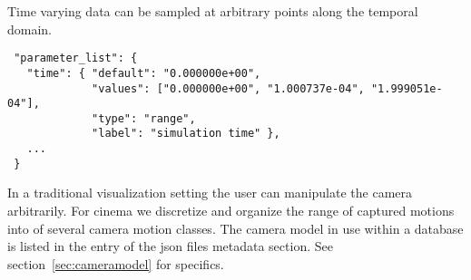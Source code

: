 \label{sec:Time}

Time varying data can be sampled at arbitrary points along the temporal domain.
\begin{verbatim}
 "parameter_list": {
   "time": { "default": "0.000000e+00",
             "values": ["0.000000e+00", "1.000737e-04", "1.999051e-04"],
             "type": "range",
             "label": "simulation time" },
   ...
 }
\end{verbatim}

\label{sec:camerapositions}

In a traditional visualization setting the user can manipulate the camera arbitrarily. For cinema we discretize and organize the range of captured motions into of several camera motion classes. 
The camera model in use within a database is listed in the \cameramodel
entry of the json files metadata section. 
See section~\ref{sec:cameramodel} for specifics. 

